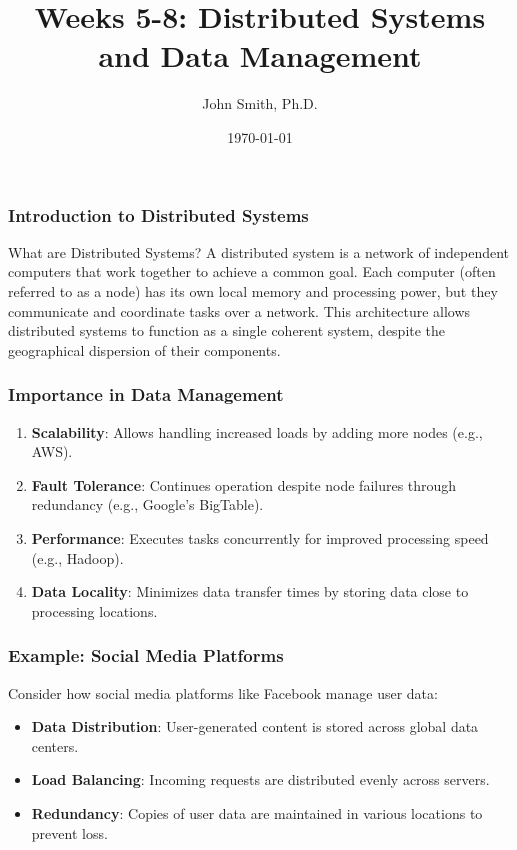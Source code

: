 \documentclass[aspectratio=169]{beamer}
\title[Distributed Systems and Data Management]{Weeks 5-8: Distributed Systems and Data Management}
\author[J. Smith]{John Smith, Ph.D.}
\institute[University Name]{
  Department of Computer Science\\
  University Name\\
  \vspace{0.3cm}
  Email: email@university.edu\\
  Website: www.university.edu
}
\date{\today}
\begin{document}
\frame{\titlepage}

\begin{frame}[fragile]
    \frametitle{Introduction to Distributed Systems}
    \begin{block}{What are Distributed Systems?}
        A distributed system is a network of independent computers that work together to achieve a common goal. 
        Each computer (often referred to as a node) has its own local memory and processing power, but they communicate 
        and coordinate tasks over a network. This architecture allows distributed systems to function as a single 
        coherent system, despite the geographical dispersion of their components.
    \end{block}
\end{frame}

\begin{frame}[fragile]
    \frametitle{Importance in Data Management}
    \begin{enumerate}
        \item \textbf{Scalability}: Allows handling increased loads by adding more nodes (e.g., AWS).
        \item \textbf{Fault Tolerance}: Continues operation despite node failures through redundancy (e.g., Google’s BigTable).
        \item \textbf{Performance}: Executes tasks concurrently for improved processing speed (e.g., Hadoop).
        \item \textbf{Data Locality}: Minimizes data transfer times by storing data close to processing locations. 
    \end{enumerate}
\end{frame}

\begin{frame}[fragile]
    \frametitle{Example: Social Media Platforms}
    Consider how social media platforms like Facebook manage user data:
    \begin{itemize}
        \item \textbf{Data Distribution}: User-generated content is stored across global data centers.
        \item \textbf{Load Balancing}: Incoming requests are distributed evenly across servers.
        \item \textbf{Redundancy}: Copies of user data are maintained in various locations to prevent loss.
    \end{itemize}
\end{frame}
\end{document}
